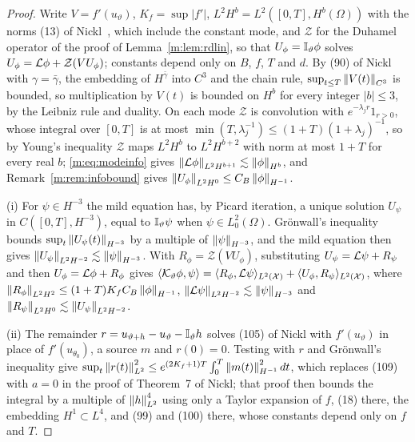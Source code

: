 \begin{proof}
Write $V=f'(u_\vartheta)$, $K_f=\sup|f'|$, $L^2H^b=L^2([0,T],H^b(\Omega))$ with the norms (13) of Nickl~\cite{nicklbvm2024}, which include the constant mode, and $\mathcal Z$ for the Duhamel operator of the proof of Lemma~\ref{m:lem:rdlin}, so that $U_\phi=\mathbb{I}_\vartheta\phi$ solves $U_\phi=\mathcal{L}\phi+\mathcal Z(VU_\phi)$; constants depend only on $B$, $f$, $T$ and $d$. By (90) of Nickl with $\gamma=\bar\gamma$, the embedding of $H^{\bar\gamma}$ into $C^3$ and the chain rule, $\sup_{t\le T}\left\|V(t)\right\|_{C^3}$ is bounded, so multiplication by $V(t)$ is bounded on $H^b$ for every integer $|b|\le3$, by the Leibniz rule and duality. On each mode $\mathcal Z$ is convolution with $e^{-\lambda_jr}1_{r>0}$, whose integral over $[0,T]$ is at most $\min(T,\lambda_j^{-1})\le(1+T)(1+\lambda_j)^{-1}$, so by Young's inequality $\mathcal Z$ maps $L^2H^b$ to $L^2H^{b+2}$ with norm at most $1+T$ for every real $b$; \eqref{m:eq:modeinfo} gives $\left\|\mathcal{L}\phi\right\|_{L^2H^{b+1}}\lesssim\left\|\phi\right\|_{H^b}$, and Remark~\ref{m:rem:infobound} gives $\left\|U_\phi\right\|_{L^2H^0}\le C_B\left\|\phi\right\|_{H^{-1}}$.

(i) For $\psi\in H^{-3}$ the mild equation has, by Picard iteration, a unique solution $U_\psi$ in $C([0,T],H^{-3})$, equal to $\mathbb{I}_\vartheta\psi$ when $\psi\in L^2_0(\Omega)$. Gr\"onwall's inequality bounds $\sup_t\left\|U_\psi(t)\right\|_{H^{-3}}$ by a multiple of $\left\|\psi\right\|_{H^{-3}}$, and the mild equation then gives $\left\|U_\psi\right\|_{L^2H^{-2}}\lesssim\left\|\psi\right\|_{H^{-3}}$. With $R_\phi=\mathcal Z(VU_\phi)$, substituting $U_\psi=\mathcal{L}\psi+R_\psi$ and then $U_\phi=\mathcal{L}\phi+R_\phi$ gives $\langle\mathcal{K}_\vartheta\phi,\psi\rangle=\langle R_\phi,\mathcal{L}\psi\rangle_{L^2(\mathcal X)}+\langle U_\phi,R_\psi\rangle_{L^2(\mathcal X)}$, where $\left\|R_\phi\right\|_{L^2H^2}\le(1+T)K_fC_B\left\|\phi\right\|_{H^{-1}}$, $\left\|\mathcal{L}\psi\right\|_{L^2H^{-2}}\lesssim\left\|\psi\right\|_{H^{-3}}$ and $\left\|R_\psi\right\|_{L^2H^0}\lesssim\left\|U_\psi\right\|_{L^2H^{-2}}$.

(ii) The remainder $r=u_{\vartheta+h}-u_\vartheta-\mathbb{I}_\vartheta h$ solves (105) of Nickl with $f'(u_\vartheta)$ in place of $f'(u_{\theta_0})$, a source $m$ and $r(0)=0$. Testing with $r$ and Gr\"onwall's inequality give $\sup_t\left\|r(t)\right\|^2_{L^2}\le e^{(2K_f+1)T}\int_0^T\left\|m(t)\right\|^2_{H^{-1}}dt$, which replaces (109) with $a=0$ in the proof of Theorem~7 of Nickl; that proof then bounds the integral by a multiple of $\left\|h\right\|^4_{L^2}$ using only a Taylor expansion of $f$, (18) there, the embedding $H^1\subset L^4$, and (99) and (100) there, whose constants depend only on $f$ and $T$.


\end{proof}
